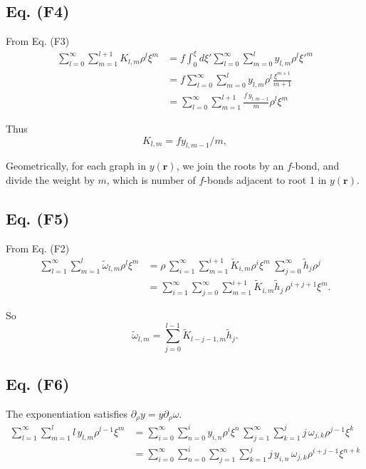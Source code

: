 \documentclass[preprint]{revtex4-1}
\numberwithin{equation}{subsection}
\numberwithin{table}{section}
\newcommand{\vct}[1]{\mathbf{#1}}
\providecommand{\vr}{} %
\renewcommand{\vr}{\vct{r}}
\begin{document}
\subsection{Eq. (F4)}

From Eq. (F3)
\begin{align*}
  \sum_{l=0}^\infty
  \sum_{m=1}^{l+1}
  K_{l,m} \rho^l \xi^m
&=
  f
  \int_0^\xi d\xi'
  \sum_{l=0}^\infty
  \sum_{m=0}^l
  y_{l,m} \rho^l {\xi'}^m
\\
&=
  f
  \sum_{l=0}^\infty
  \sum_{m=0}^l
  y_{l,m} \rho^l \frac{ \xi^{m+1} }{m+1}
\\
&=
  \sum_{l=0}^\infty
  \sum_{m=1}^{l+1}
  \frac{ f \, y_{l,m-1} }{m} \rho^l \xi^{m}
\end{align*}

Thus
\[
  K_{l,m} = f y_{l, m-1}/m,
\]


Geometrically, for each graph in $y(\vr)$,
we join the roots by an $f$-bond,
and divide the weight by $m$,
which is number of $f$-bonds adjacent to root 1
in $y(\vr)$.



\subsection{Eq. (F5)}

From Eq. (F2)
\begin{align*}
  \sum_{l=1}^\infty
  \sum_{m=1}^{l}
  \tilde\omega_{l,m} \rho^l \xi^m
&=
  \rho
  \,
  \sum_{i=1}^\infty
  \sum_{m=1}^{i+1}
  \tilde K_{i,m} \rho^i \xi^m
 \;
  \sum_{j=0}^\infty
  \tilde h_{j} \rho^j
\\
&=
  \sum_{i=1}^\infty
  \sum_{j=0}^\infty
  \sum_{m=1}^{i+1}
  \tilde K_{i,m}
  \tilde h_j
  \, \rho^{i+j+1} \xi^m.
\end{align*}

So
\[
  \tilde \omega_{l,m}
=
  \sum_{j = 0}^{l-1}
  \tilde K_{l - j - 1, m}
  \tilde h_{j}.
\]



\subsection{Eq. (F6)}

The exponentiation satisfies $\partial_\rho y = y \partial_\rho \omega$.
\begin{align*}
\sum_{l = 1}^\infty
\sum_{m = 1}^l
l \, y_{l, m} \rho^{l-1} \xi^m
&=
\sum_{i = 0}^\infty
\sum_{n = 0}^i
y_{i, n} \rho^{i} \xi^n
\,
\sum_{j = 1}^\infty
\sum_{k = 1}^j
j \, \omega_{j, k} \rho^{j-1} \xi^k
\\
&=
\sum_{i = 0}^\infty
\sum_{n = 0}^i
\sum_{j = 1}^\infty
\sum_{k = 1}^j
j \, y_{i, n} \,
\omega_{j, k} \rho^{i+j-1} \xi^{n+k}
\end{align*}
\end{document}
